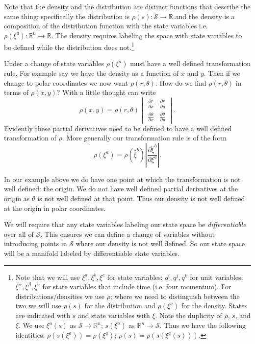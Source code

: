 \documentclass{article}
\begin{document}
	 Note that the density and the distribution are distinct functions that describe the same thing; specifically the distribution is $\rho(s) : \mathcal{S} \to \mathbb{R}$ and the density is a composition of the distribution function with the state variables i.e. $\rho(\xi^a) : \mathbb{R}^n \to \mathbb{R}$. The density requires labeling the space with state variables to be defined while the distribution does not.\footnote{Note that we will use $\xi^a, \xi^b, \xi^c$ for state variables; $q^i, q^j, q^k$ for unit variables; $\xi^\alpha, \xi^\beta, \xi^\gamma$ for state variables that include time (i.e. four momentum). For distributions/densities we use $\rho$; where we need to distinguish between the two we will use $\rho(s)$ for the distribution and $\rho(\xi^a)$ for the density. States are indicated with $s$ and state variables with $\xi$. Note the duplicity of $\rho$, $s$, and $\xi$. We use $\xi^a(s)$ as $\mathcal{S} \to \mathbb{R}^n$; $s(\xi^a)$ as $\mathbb{R}^n \to \mathcal{S}$.
Thus we have the following identities: $\rho(s(\xi^a)) = \rho(\xi^a)$; $\rho(s) = \rho(s (\xi^a(s)))$.}


	Under a change of state variables $\rho(\xi^a)$ must have a well defined transformation rule. For example say we have the density as a function of $x$ and $y$. Then if we change to polar coordinates we now want $\rho(r,\theta)$. How do we find $\rho(r,\theta)$ in terms of $\rho(x,y)$? With a little thought can write $$\rho(x,y) = \rho(r,\theta)\begin{vmatrix}
\frac{\partial r}{\partial x} & \frac{\partial r}{\partial y} \\
\frac{\partial \theta}{\partial x} & \frac{\partial \theta}{\partial y}
\end{vmatrix}.$$ Evidently these partial derivatives need to be defined to have a well defined transformation of $\rho$. More generally our transformation rule is of the form $$\rho(\xi^a) = \rho(\hat{\xi}^b)\left|\frac{\partial\hat{\xi}^b}{\partial\xi^a}\right|.$$

	In our example above we do have one point at which the transformation is not well defined: the origin. We do not have well defined partial derivatives at the origin as $\theta$ is not well defined at that point. Thus our density is not well defined at the origin in polar coordinates.
	
	We will require that any state variables labeling our state space be \textit{differentiable} over all of $\mathcal{S}$. This ensures we can define a change of variables without introducing points in $\mathcal{S}$ where our density is not well defined. So our state space will be a manifold labeled by differentiable state variables.
\end{document}
